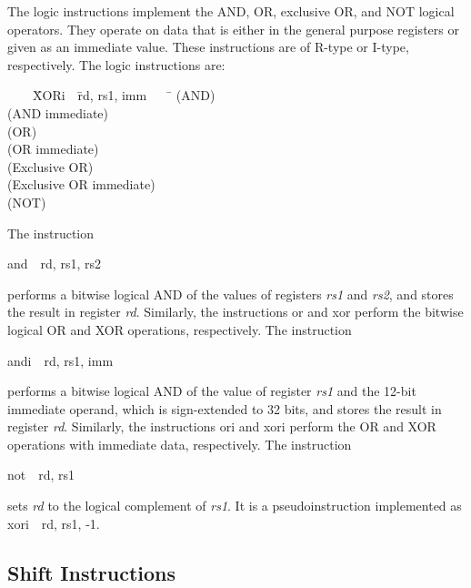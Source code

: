 \documentclass[11pt, twoside, pdftex]{article}
\newenvironment{ctabbing}%
{\begin{center}\begin{minipage}{\textwidth}\begin{tabbing}}
{\end{tabbing}\end{minipage}\end{center}}
\begin{document}
The logic instructions implement the AND, OR, exclusive OR, and NOT logical operators. They 
operate on data that is either in the general purpose registers or given as an immediate
value. These instructions are of R-type or I-type, respectively. The logic instructions are:
\vspace{-\baselineskip}
\begin{ctabbing}
~~~~\={\sf XORi}~~\={\sf rd, rs1, imm}~~~~\=\kill
{} \>(AND)\\
 \>(AND immediate)\\
 \>(OR)\\
 \>(OR immediate)\\
 \>(Exclusive OR)\\
 \>(Exclusive OR immediate)\\
 \>(NOT)\\
\end{ctabbing}
\vspace{-\baselineskip}
The instruction
\vspace{-\baselineskip}
\begin{center}
{\sf and~~rd, rs1, rs2} 
\end{center}
\noindent
performs a bitwise logical AND of the values of registers {\it rs1} and {\it rs2}, and stores 
the result in register {\it rd}. Similarly, the instructions {\sf or} and {\sf xor}
perform the bitwise logical OR and XOR operations, respectively.  The instruction
\vspace{-\baselineskip}
\begin{center}
{\sf andi~~rd, rs1, imm} 
\end{center}
\noindent
performs a bitwise logical AND of the value of register {\it rs1} and the 12-bit immediate
operand, which is sign-extended to 32 bits, and stores the result in register {\it rd}.
Similarly, the instructions {\sf ori} and {\sf xori} perform the OR and XOR operations 
with immediate data, respectively.
The instruction
\vspace{-\baselineskip}
\begin{center}
{\sf not~~rd, rs1} 
\end{center}
\noindent
sets {\it rd} to the logical complement of {\it rs1}. It is a pseudoinstruction
implemented as {\sf xori~~rd, rs1, -1}.
\subsection{Shift Instructions}
\end{document}
